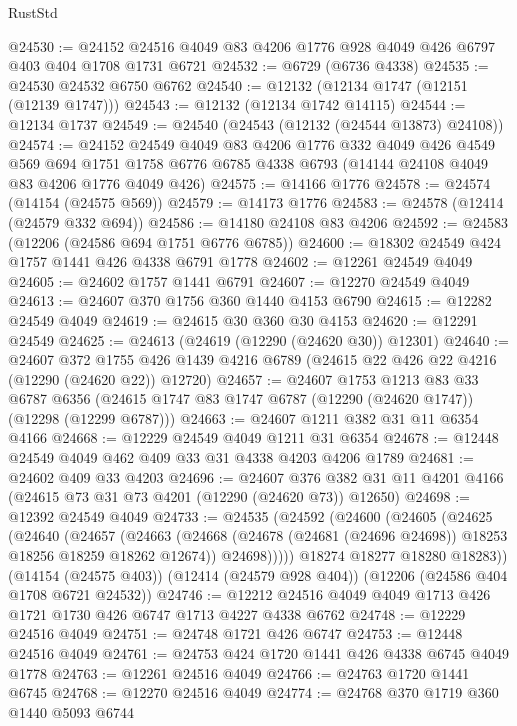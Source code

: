\begin{lexlean}{RustStd}
\begin{coremodule}
{\begin{coremodule}
{{{{{{{{{{{{{{{{{{{{{{{{{{{{{{{{{{{{{{{{{{{{{{{{{{@24530 := @24152 @24516 @4049 @83 @4206 @1776 @928 @4049 @426 @6797 @403 @404 @1708 @1731 @6721
@24532 := @6729 (@6736 @4338)
@24535 := @24530 @24532 @6750 @6762
@24540 := @12132 (@12134 @1747 (@12151 (@12139 @1747)))
@24543 := @12132 (@12134 @1742 @14115)
@24544 := @12134 @1737
@24549 := @24540 (@24543 (@12132 (@24544 @13873) @24108))
@24574 := @24152
    @24549
    @4049
    @83
    @4206
    @1776
    @332
    @4049
    @426
    @4549
    @569
    @694
    @1751
    @1758
    @6776
    @6785
    @4338
    @6793
    (@14144 @24108 @4049 @83 @4206 @1776 @4049 @426)
@24575 := @14166 @1776
@24578 := @24574 (@14154 (@24575 @569))
@24579 := @14173 @1776
@24583 := @24578 (@12414 (@24579 @332 @694))
@24586 := @14180 @24108 @83 @4206
@24592 := @24583 (@12206 (@24586 @694 @1751 @6776 @6785))
@24600 := @18302 @24549 @424 @1757 @1441 @426 @4338 @6791 @1778
@24602 := @12261 @24549 @4049
@24605 := @24602 @1757 @1441 @6791
@24607 := @12270 @24549 @4049
@24613 := @24607 @370 @1756 @360 @1440 @4153 @6790
@24615 := @12282 @24549 @4049
@24619 := @24615 @30 @360 @30 @4153
@24620 := @12291 @24549
@24625 := @24613 (@24619 (@12290 (@24620 @30)) @12301)
@24640 := @24607
    @372
    @1755
    @426
    @1439
    @4216
    @6789
    (@24615 @22 @426 @22 @4216 (@12290 (@24620 @22)) @12720)
@24657 := @24607
    @1753
    @1213
    @83
    @33
    @6787
    @6356
    (@24615 @1747 @83 @1747 @6787 (@12290 (@24620 @1747)) (@12298 (@12299 @6787)))
@24663 := @24607 @1211 @382 @31 @11 @6354 @4166
@24668 := @12229 @24549 @4049 @1211 @31 @6354
@24678 := @12448 @24549 @4049 @462 @409 @33 @31 @4338 @4203 @4206 @1789
@24681 := @24602 @409 @33 @4203
@24696 := @24607
    @376
    @382
    @31
    @11
    @4201
    @4166
    (@24615 @73 @31 @73 @4201 (@12290 (@24620 @73)) @12650)
@24698 := @12392 @24549 @4049
@24733 := @24535
    (@24592
      (@24600
        (@24605
          (@24625
            (@24640
              (@24657
                (@24663
                  (@24668 (@24678 (@24681 (@24696 @24698)) @18253 @18256 @18259 @18262 @12674))
                  @24698)))))
        @18274
        @18277
        @18280
        @18283))
    (@14154 (@24575 @403))
    (@12414 (@24579 @928 @404))
    (@12206 (@24586 @404 @1708 @6721 @24532))
@24746 := @12212 @24516 @4049 @4049 @1713 @426 @1721 @1730 @426 @6747 @1713 @4227 @4338 @6762
@24748 := @12229 @24516 @4049
@24751 := @24748 @1721 @426 @6747
@24753 := @12448 @24516 @4049
@24761 := @24753 @424 @1720 @1441 @426 @4338 @6745 @4049 @1778
@24763 := @12261 @24516 @4049
@24766 := @24763 @1720 @1441 @6745
@24768 := @12270 @24516 @4049
@24774 := @24768 @370 @1719 @360 @1440 @5093 @6744
}}}}}}}}}}}}}}}}}}}}}}}}}}}}}}}}}}}}}}}}}}}}}}}}}}
\end{coremodule}}
\end{coremodule}
\end{lexlean}
